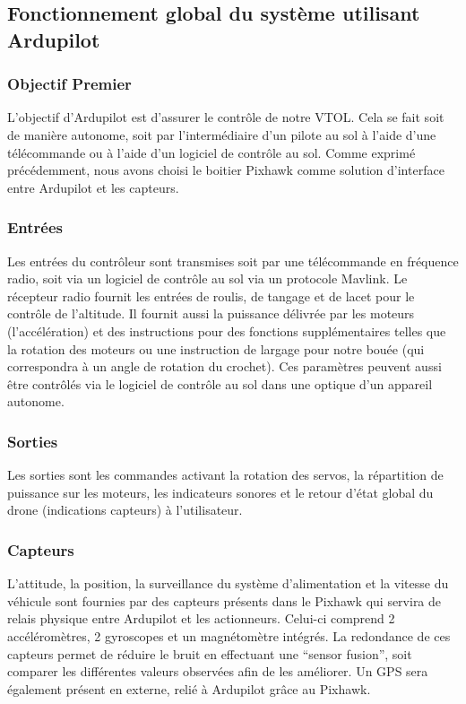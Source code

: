 \documentclass[a4paper,12pt,french]{report}
\begin{document}
\subsection{Fonctionnement global du système utilisant Ardupilot}

\subsubsection{Objectif Premier}
L’objectif d’Ardupilot est d’assurer le contrôle de notre VTOL. Cela se fait soit de manière autonome, soit par l’intermédiaire d’un pilote au sol à l’aide d’une télécommande ou à l’aide d’un logiciel de contrôle au sol. Comme exprimé précédemment, nous avons choisi le boitier Pixhawk comme solution d’interface entre Ardupilot et les capteurs.

\subsubsection{Entrées}
Les entrées du contrôleur sont transmises soit par une télécommande en fréquence radio, soit via un logiciel de contrôle au sol via un protocole Mavlink. Le récepteur radio fournit les entrées de roulis, de tangage et de lacet pour le contrôle de l’altitude. Il fournit aussi la puissance délivrée par les moteurs (l’accélération) et des instructions pour des fonctions supplémentaires telles que la rotation des moteurs ou une instruction de largage pour notre bouée (qui correspondra à un angle de rotation du crochet). Ces paramètres peuvent aussi être contrôlés via le logiciel de contrôle au sol dans une optique d’un appareil autonome.

\subsubsection{Sorties}

Les sorties sont les commandes activant la rotation des servos, la répartition de puissance sur les moteurs, les indicateurs sonores et le retour d’état global du drone (indications capteurs) à l’utilisateur.

\subsubsection{Capteurs}

L'attitude, la position, la surveillance du système d'alimentation et la vitesse du véhicule sont fournies par des capteurs présents dans le Pixhawk qui servira de relais physique entre Ardupilot et les actionneurs. Celui-ci comprend 2 accéléromètres, 2 gyroscopes et un magnétomètre intégrés. La redondance de ces capteurs permet de réduire le bruit en effectuant une “sensor fusion”, soit comparer les différentes valeurs observées afin de les améliorer. Un GPS sera également présent en externe, relié à Ardupilot grâce au Pixhawk.
\end{document}
